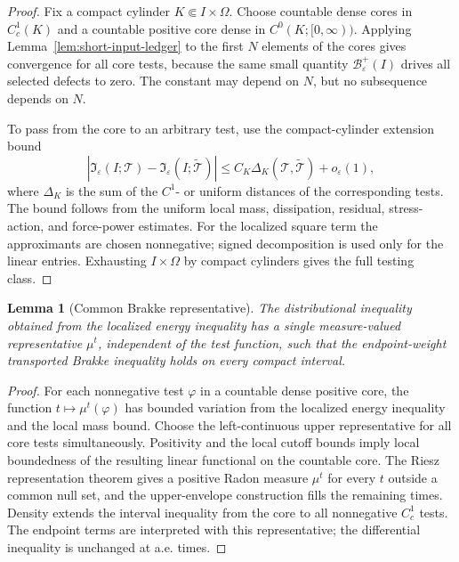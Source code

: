 \documentclass[11pt]{article}
\newtheorem{lemma}[theorem]{Lemma}
\theoremstyle{definition}
\newcommand{\eps}{\varepsilon}
\newcommand{\Basin}{\mathcal B}
\begin{document}
\begin{proof}
Fix a compact cylinder \(K\Subset I\times\Omega\).  Choose countable dense
cores in \(C_c^1(K)\) and a countable positive core dense in
\(C^0(K;[0,\infty))\).  Applying Lemma~\ref{lem:short-input-ledger} to the
first \(N\) elements of the cores gives convergence for all core tests, because
the same small quantity \(\Basin_\eps^+(I)\) drives all selected defects to
zero.  The constant may depend on \(N\), but no subsequence depends on \(N\).

To pass from the core to an arbitrary test, use the compact-cylinder extension
bound
\[
        |\mathfrak I_\eps(I;\mathscr T)
        -
        \mathfrak I_\eps(I;\widetilde{\mathscr T})|
        \le
        C_K\Delta_K(\mathscr T,\widetilde{\mathscr T})
        +
        o_\eps(1),
\]
where \(\Delta_K\) is the sum of the \(C^1\)- or uniform distances of the
corresponding tests.  The bound follows from the uniform local mass,
dissipation, residual, stress-action, and force-power estimates.  For the
localized square term the approximants are chosen nonnegative; signed
decomposition is used only for the linear entries.  Exhausting
\(I\times\Omega\) by compact cylinders gives the full testing class.
\end{proof}

\begin{lemma}[Common Brakke representative]
\label{lem:short-common-representative}
The distributional inequality obtained from the localized energy inequality has
a single measure-valued representative \(\mu^t\), independent of the test
function, such that the endpoint-weight transported Brakke inequality holds on every
compact interval.
\end{lemma}

\begin{proof}
For each nonnegative test \(\varphi\) in a countable dense positive core, the
function \(t\mapsto\mu^t(\varphi)\) has bounded variation from the localized
energy inequality and the local mass bound.  Choose the left-continuous upper
representative for all core tests simultaneously.  Positivity and the local
cutoff bounds imply local boundedness of the resulting linear functional on the
countable core.  The Riesz representation theorem gives a positive Radon
measure \(\mu^t\) for every \(t\) outside a common null set, and the
upper-envelope construction fills the remaining times.  Density extends the
interval inequality from the core to all nonnegative \(C_c^1\) tests.  The
endpoint terms are interpreted with this representative; the differential
inequality is unchanged at a.e. times.
\end{proof}
\end{document}
